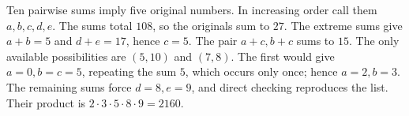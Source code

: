 Ten pairwise sums imply five original numbers. In increasing order call them $a,b,c,d,e$. The sums total $108$, so the originals sum to $27$. The extreme sums give $a+b=5$ and $d+e=17$, hence $c=5$. The pair $a+c,b+c$ sums to $15$. The only available possibilities are $(5,10)$ and $(7,8)$. The first would give $a=0,b=c=5$, repeating the sum $5$, which occurs only once; hence $a=2,b=3$. The remaining sums force $d=8,e=9$, and direct checking reproduces the list. Their product is $2\cdot3\cdot5\cdot8\cdot9=\boxed{2160}$.
